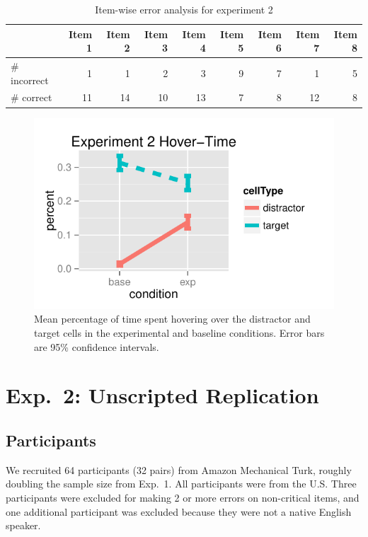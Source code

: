 \documentclass[10pt,letterpaper]{article}
\begin{document}
\begin{table}
\begin{center}
\begin{tabular}{ p{2cm} | r | r |  r | r | r | r | r | r |}
& Item 1 & Item 2 & Item 3 & Item 4 & Item 5 & Item 6 & Item 7 & Item 8\\\hline
 \# incorrect & 1 & 1 & 2 & 3 & 9 & 7 & 1 & 5 \\
 \# correct   & 11&14&10&13&7 &8   &12& 8 \\
\end{tabular}
\caption{Item-wise error analysis for experiment 2}
\label{table:exp2ItemWise}
\end{center}
\end{table}

\begin{figure}[b!]
\begin{center}
\includegraphics[scale=.9]{images/exp2MouseTracking.pdf}
\caption{Mean percentage of time spent hovering over the distractor and target cells in the experimental and baseline conditions. Error bars are 95\% confidence intervals.}
\label{fig:exp2hover}
\end{center}
\end{figure}
\section{Exp.~2: Unscripted Replication}
\label{sec:Exp2}

\subsection{Participants}

We recruited 64 participants (32 pairs) from Amazon Mechanical Turk, roughly doubling the sample size from Exp.~1. All participants were from the U.S. Three participants were excluded for making 2 or more errors on non-critical items, and one additional participant was excluded because they were not a native English speaker.
\end{document}

